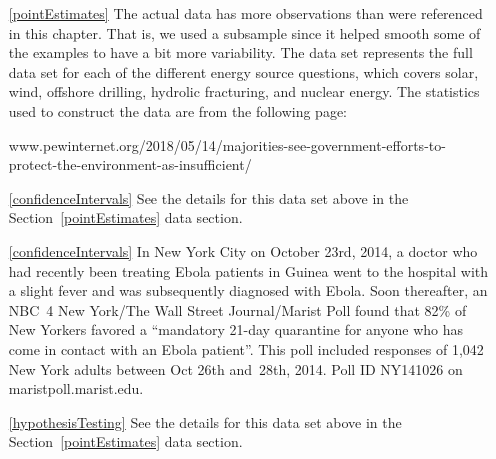 
\begin{itemize}
\item[\ref{pointEstimates}]
    The actual data has more observations than were referenced
    in this chapter.
    That is, we used a subsample since it helped smooth some
    of the examples to have a bit more variability.
    The  data set represents
    the full data set for each of the different energy source
    questions, which covers solar, wind, offshore drilling,
    hydrolic fracturing, and nuclear energy.
    The statistics used to construct the data are from
    the following page:
    \begin{center}
        {{\small{www.pewinternet.org/2018/05/14/majorities-see-government-efforts-to-protect-the-environment-as-insufficient/}}}
    \end{center}
    
\item[\ref{confidenceIntervals}]
    See the details for this data set above
    in the Section~\ref{pointEstimates} data section.
\item[\ref{confidenceIntervals}]
    In New York City on October 23rd, 2014, a doctor who had
    recently been treating Ebola patients in Guinea went to
    the hospital with a slight fever and was subsequently
    diagnosed with Ebola.
    Soon thereafter, an NBC~4 New York/The Wall Street
    Journal/Marist Poll found that
    82\% of New Yorkers favored a
    ``mandatory 21-day quarantine for anyone who has come
    in contact with an Ebola patient''.
    This poll included responses of 1,042
    New York adults between Oct 26th and~28th, 2014.
        {Poll ID NY141026 on maristpoll.marist.edu}.

\item[\ref{hypothesisTesting}]
    See the details for this data set above
    in the Section~\ref{pointEstimates} data section.
\end{itemize}







\D{\newpage}

